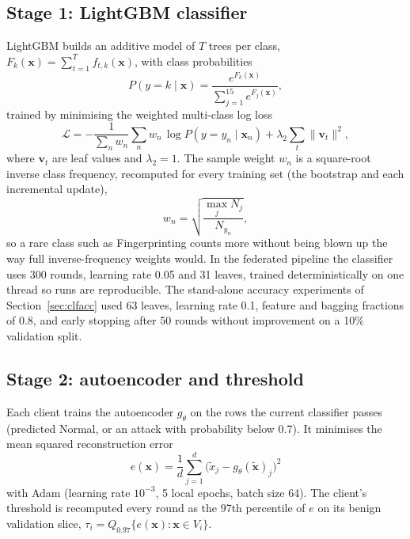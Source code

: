 \subsection{Stage 1: LightGBM classifier}
LightGBM builds an additive model of $T$ trees per class, $F_k(\mathbf{x}) = \sum_{t=1}^{T} f_{t,k}(\mathbf{x})$, with class probabilities
\begin{equation}
  P(y=k\mid\mathbf{x}) = \frac{e^{F_k(\mathbf{x})}}{\sum_{j=1}^{15} e^{F_j(\mathbf{x})}},
\end{equation}
trained by minimising the weighted multi-class log loss
\begin{equation}
  \mathcal{L} = -\frac{1}{\sum_n w_n}\sum_{n} w_{n}\,\log P(y=y_n\mid\mathbf{x}_n) + \lambda_2 \sum_{t}\lVert \mathbf{v}_t\rVert^2 ,
\end{equation}
where $\mathbf{v}_t$ are leaf values and $\lambda_2 = 1$. The sample weight $w_n$ is a square-root inverse class frequency, recomputed for every training set (the bootstrap and each incremental update),
\begin{equation}
  w_n = \sqrt{\frac{\max_j N_j}{N_{y_n}}},
\end{equation}
so a rare class such as Fingerprinting counts more without being blown up the way full inverse-frequency weights would. In the federated pipeline the classifier uses 300 rounds, learning rate 0.05 and 31 leaves, trained deterministically on one thread so runs are reproducible. The stand-alone accuracy experiments of Section~\ref{sec:clfacc} used 63 leaves, learning rate 0.1, feature and bagging fractions of 0.8, and early stopping after 50 rounds without improvement on a 10\% validation split.

\subsection{Stage 2: autoencoder and threshold}
Each client trains the autoencoder $g_\theta$ on the rows the current classifier passes (predicted Normal, or an attack with probability below 0.7). It minimises the mean squared reconstruction error
\begin{equation}
  e(\mathbf{x}) = \frac{1}{d}\sum_{j=1}^{d}\big(\tilde{x}_j - g_\theta(\tilde{\mathbf{x}})_j\big)^2
\end{equation}
with Adam (learning rate $10^{-3}$, 5 local epochs, batch size 64). The client's threshold is recomputed every round as the 97th percentile of $e$ on its benign validation slice, $\tau_i = Q_{0.97}\{e(\mathbf{x}) : \mathbf{x}\in V_i\}$.

